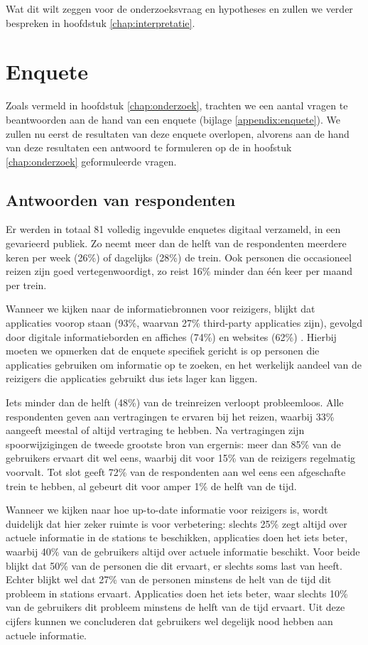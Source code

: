 Wat dit wilt zeggen voor de onderzoeksvraag en hypotheses en zullen we verder bespreken in hoofdstuk \ref{chap:interpretatie}.

\section{Enquete}
Zoals vermeld in hoofdstuk \ref{chap:onderzoek}, trachten we een aantal vragen te beantwoorden aan de hand van een enquete (bijlage \ref{appendix:enquete}). We zullen nu eerst de resultaten van deze enquete overlopen, alvorens aan de hand van deze resultaten een antwoord te formuleren op de in hoofstuk \ref{chap:onderzoek} geformuleerde vragen.

\subsection{Antwoorden van respondenten}
Er werden in totaal 81 volledig ingevulde enquetes digitaal verzameld, in een gevarieerd publiek. Zo neemt meer dan de helft van de respondenten meerdere keren per week (26\%) of dagelijks (28\%) de trein. Ook personen die occasioneel reizen zijn goed vertegenwoordigt, zo reist 16\% minder dan één keer per maand per trein.

Wanneer we kijken naar de informatiebronnen voor reizigers, blijkt dat  applicaties voorop staan (93\%, waarvan 27\% third-party applicaties zijn), gevolgd door digitale informatieborden en affiches (74\%) en websites (62\%) . Hierbij moeten we opmerken dat de enquete specifiek gericht is op personen die applicaties gebruiken om informatie op te zoeken, en het werkelijk aandeel van de reizigers die applicaties gebruikt dus iets lager kan liggen.

Iets minder dan de helft (48\%) van de treinreizen verloopt probleemloos. Alle respondenten geven aan vertragingen te ervaren bij het reizen, waarbij 33\% aangeeft meestal of altijd vertraging te hebben. Na vertragingen zijn spoorwijzigingen de tweede grootste bron van ergernis: meer dan 85\% van de gebruikers ervaart dit wel eens, waarbij dit voor 15\% van de reizigers regelmatig voorvalt. Tot slot geeft 72\% van de respondenten aan wel eens een afgeschafte trein te hebben, al gebeurt dit voor amper 1\% de helft van de tijd.

Wanneer we kijken naar hoe up-to-date informatie voor reizigers is, wordt duidelijk dat hier zeker ruimte is voor verbetering: slechts 25\% zegt altijd over actuele informatie in de stations te beschikken, applicaties doen het iets beter, waarbij 40\% van de gebruikers altijd over actuele informatie beschikt. Voor beide blijkt dat 50\% van de personen die dit ervaart, er slechts soms last van heeft. Echter blijkt wel dat 27\% van de personen minstens de helt van de tijd dit probleem in stations ervaart. Applicaties doen het iets beter, waar slechts 10\% van de gebruikers dit probleem minstens de helft van de tijd ervaart. Uit deze cijfers kunnen we concluderen dat gebruikers wel degelijk nood hebben aan actuele informatie. 

